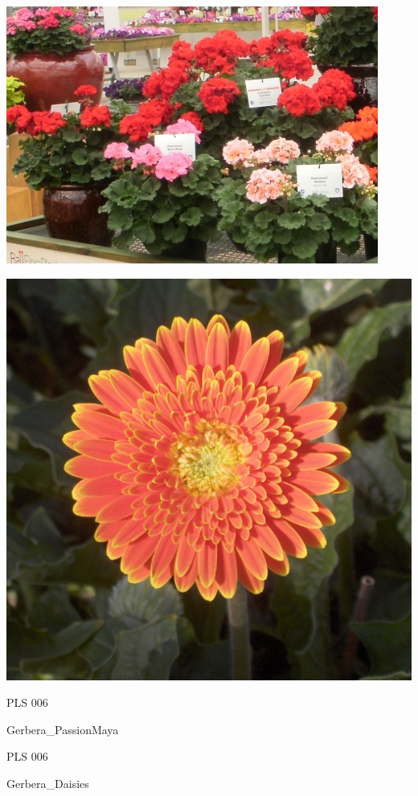 \documentclass{article}
\begin{document}
\begin{center}
\includegraphics[height=0.925\paperheight]{../Geranium.jpg}
\end{center}
\newpage

\begin{center}
\includegraphics[height=0.925\paperheight]{../Gerbera.jpg}
\end{center}
\newpage

\noindent  PLS 006
\vfill
\centerline{{\huge Gerbera\_PassionMaya }}
\vfill
\newpage

\noindent  PLS 006
\vfill
\centerline{{\huge Gerbera\_Daisies }}
\vfill
\newpage
\end{document}
